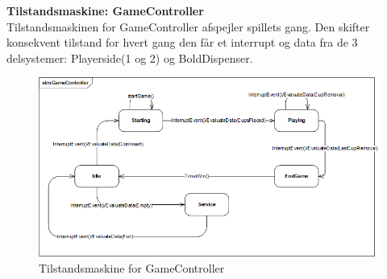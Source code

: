 \documentclass[Arkitektur/System_main.tex]{subfiles}
\begin{document}
\textbf{Tilstandsmaskine: GameController}\\
Tilstandsmaskinen for GameController afspejler spillets gang. Den skifter konsekvent tilstand for hvert gang den får et interrupt og data fra de 3 delsystemer: Playerside(1 og 2) og BoldDispenser. 

\begin{figure}[H]
    \centering
    \includegraphics[width=\textwidth]{Arkitektur/Softwarearkitektur/Applikationsmodel/RPi/graphics_RPi/stm_Game.png}
    \caption{Tilstandsmaskine for GameController}
    \label{fig:stm_Game}
\end{figure}
\end{document}
